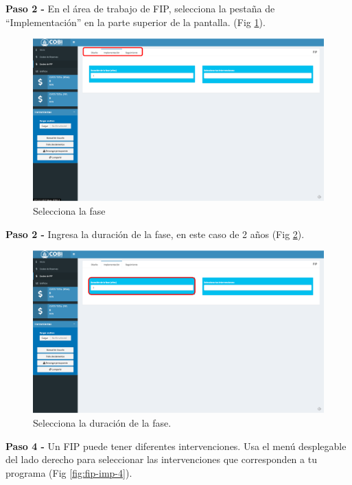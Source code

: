\documentclass[
]{book}
\begin{document}
\textbf{Paso 2 - } En el área de trabajo de FIP, selecciona la pestaña de ``Implementación'' en la parte superior de la pantalla. (Fig \ref{fig:fip-imp-2}).

\begin{figure}
\includegraphics[width=61.11in]{images/fip-imp-2} \caption{Selecciona la fase}\label{fig:fip-imp-2}
\end{figure}

\textbf{Paso 2 - } Ingresa la duración de la fase, en este caso de 2 años (Fig \ref{fig:fip-imp-3}).

\begin{figure}
\includegraphics[width=61.11in]{images/fip-imp-3} \caption{Selecciona la duración de la fase.}\label{fig:fip-imp-3}
\end{figure}

\textbf{Paso 4 - } Un FIP puede tener diferentes intervenciones. Usa el menú desplegable del lado derecho para seleccionar las intervenciones que corresponden a tu programa (Fig \ref{fig:fip-imp-4}).
\end{document}
